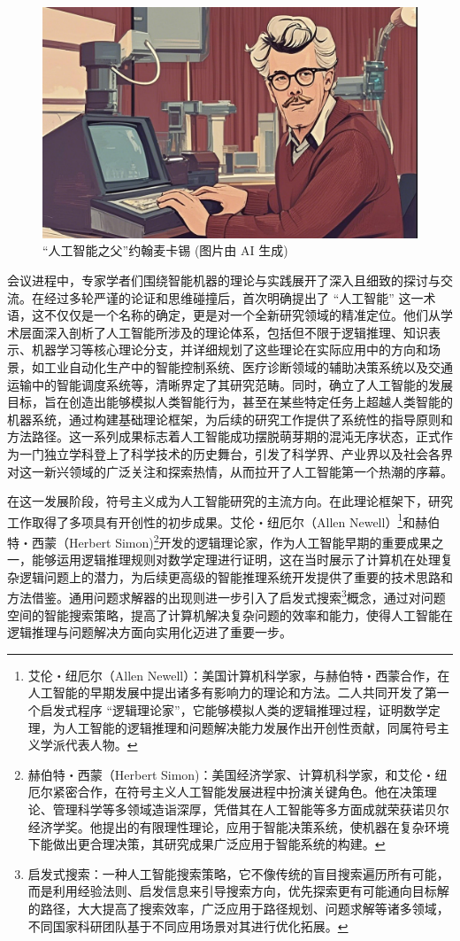 \begin{figure}[htbp]
    \centering
    \includegraphics[width=0.75\linewidth]{image/1/John McCarthy.png}
    \caption{“人工智能之父”约翰麦卡锡 (图片由 AI 生成)}
\end{figure}

会议进程中，专家学者们围绕智能机器的理论与实践展开了深入且细致的探讨与交流。在经过多轮严谨的论证和思维碰撞后，首次明确提出了 “人工智能” 这一术语，这不仅仅是一个名称的确定，更是对一个全新研究领域的精准定位。他们从学术层面深入剖析了人工智能所涉及的理论体系，包括但不限于逻辑推理、知识表示、机器学习等核心理论分支，并详细规划了这些理论在实际应用中的方向和场景，如工业自动化生产中的智能控制系统、医疗诊断领域的辅助决策系统以及交通运输中的智能调度系统等，清晰界定了其研究范畴。同时，确立了人工智能的发展目标，旨在创造出能够模拟人类智能行为，甚至在某些特定任务上超越人类智能的机器系统，通过构建基础理论框架，为后续的研究工作提供了系统性的指导原则和方法路径。这一系列成果标志着人工智能成功摆脱萌芽期的混沌无序状态，正式作为一门独立学科登上了科学技术的历史舞台，引发了科学界、产业界以及社会各界对这一新兴领域的广泛关注和探索热情，从而拉开了人工智能第一个热潮的序幕。


在这一发展阶段，符号主义成为人工智能研究的主流方向。在此理论框架下，研究工作取得了多项具有开创性的初步成果。艾伦・纽厄尔（Allen Newell）\footnote{艾伦・纽厄尔（Allen Newell）：美国计算机科学家，与赫伯特・西蒙合作，在人工智能的早期发展中提出诸多有影响力的理论和方法。二人共同开发了第一个启发式程序 “逻辑理论家”，它能够模拟人类的逻辑推理过程，证明数学定理，为人工智能的逻辑推理和问题解决能力发展作出开创性贡献，同属符号主义学派代表人物。}和赫伯特・西蒙（Herbert Simon)\footnote{赫伯特・西蒙（Herbert Simon)：美国经济学家、计算机科学家，和艾伦・纽厄尔紧密合作，在符号主义人工智能发展进程中扮演关键角色。他在决策理论、管理科学等多领域造诣深厚，凭借其在人工智能等多方面成就荣获诺贝尔经济学奖。他提出的有限理性理论，应用于智能决策系统，使机器在复杂环境下能做出更合理决策，其研究成果广泛应用于智能系统的构建。}开发的逻辑理论家，作为人工智能早期的重要成果之一，能够运用逻辑推理规则对数学定理进行证明，这在当时展示了计算机在处理复杂逻辑问题上的潜力，为后续更高级的智能推理系统开发提供了重要的技术思路和方法借鉴。通用问题求解器的出现则进一步引入了启发式搜索\footnote{启发式搜索：一种人工智能搜索策略，它不像传统的盲目搜索遍历所有可能，而是利用经验法则、启发信息来引导搜索方向，优先探索更有可能通向目标解的路径，大大提高了搜索效率，广泛应用于路径规划、问题求解等诸多领域，不同国家科研团队基于不同应用场景对其进行优化拓展。}概念，通过对问题空间的智能搜索策略，提高了计算机解决复杂问题的效率和能力，使得人工智能在逻辑推理与问题解决方面向实用化迈进了重要一步。


